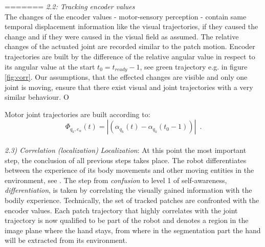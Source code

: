 =======
\textit{2.2: Tracking encoder values} \\ \newline
The changes of the encoder values - motor-sensory perception - contain same temporal displacement information like the visual trajectories, if they caused the change and if they were caused in the visual field as assumed. The relative changes of the actuated joint are recorded similar to the patch motion.  Encoder trajectories are built by the difference of the relative angular value in respect to its angular value at the start $t_0 = t_{ready}-1$, see green trajectory e.g. in figure \ref{fig:corr}. Our assumptions, that the effected changes are visible and only one joint is moving, ensure that there exist visual and joint trajectories with a very similar behaviour. O%

Motor joint trajectories are built according to: 
\begin{equation}
\label{jointtrajectory}
	\Phi_{q_{k}, e_{\alpha}} \left(t\right) = \left| \left( \alpha_{q_{k}} \left(t\right) - \alpha_{q_{k}} \left(t_0-1\right)\right) \right| \enspace .
\end{equation} 
\\ \newline
%
%
\textit{2.3) Correlation (localization)}\newline%
\textit{Localization}: At this point the most important step, the conclusion of all previous steps takes place. The 						robot differentiates between the experience of its body movements and other moving entities in the environment, see 				\cite{FLSAUEL03-02}. The step from \textit{confusion} to level 1 of self-awareness, \textit{differentiation}, is 							taken by correlating the visually gained information with the bodily experience. Technically, the set of tracked  						patches are confronted with the encoder values. Each patch trajectory that highly correlates with the joint 									trajectory is now qualified to be part of the robot and denotes a region in the image plane where the hand stays, from where in the segmentation part the hand will be extracted from its environment.

